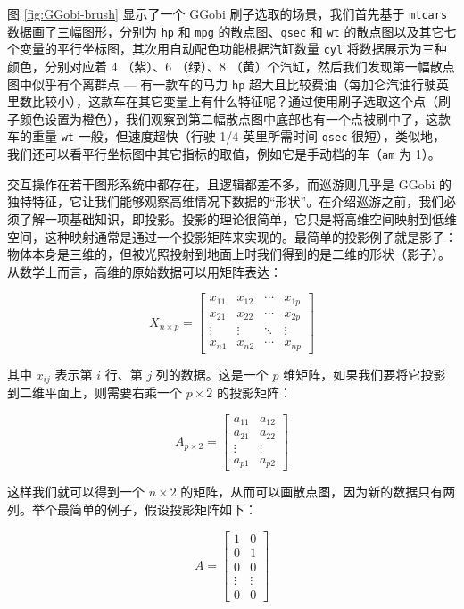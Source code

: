 \documentclass[
  b5paper,
  UTF8,twoside]{book}
\begin{document}
图 \ref{fig:GGobi-brush} 显示了一个 GGobi 刷子选取的场景，我们首先基于 \texttt{mtcars} 数据画了三幅图形，分别为 \texttt{hp} 和 \texttt{mpg} 的散点图、\texttt{qsec} 和 \texttt{wt} 的散点图以及其它七个变量的平行坐标图，其次用自动配色功能根据汽缸数量 \texttt{cyl} 将数据展示为三种颜色，分别对应着 4 （紫）、6 （绿）、8 （黄）个汽缸，然后我们发现第一幅散点图中似乎有个离群点 --- 有一款车的马力 \texttt{hp} 超大且比较费油（每加仑汽油行驶英里数比较小），这款车在其它变量上有什么特征呢？通过使用刷子选取这个点（刷子颜色设置为橙色），我们观察到第二幅散点图中底部也有一个点被刷中了，这款车的重量 \texttt{wt} 一般，但速度超快（行驶 1/4 英里所需时间 \texttt{qsec} 很短），类似地，我们还可以看平行坐标图中其它指标的取值，例如它是手动档的车（\texttt{am} 为 1）。

交互操作在若干图形系统中都存在，且逻辑都差不多，而巡游则几乎是 GGobi 的独特特征，它让我们能够观察高维情况下数据的``形状''。在介绍巡游之前，我们必须了解一项基础知识，即投影。投影的理论很简单，它只是将高维空间映射到低维空间，这种映射通常是通过一个投影矩阵来实现的。最简单的投影例子就是影子：物体本身是三维的，但被光照投射到地面上时我们得到的是二维的形状（影子）。从数学上而言，高维的原始数据可以用矩阵表达：

\[X_{n\times p} = \left[\begin{array}{cccc}
x_{11} & x_{12} & \cdots & x_{1p}\\
x_{21} & x_{22} & \cdots & x_{2p}\\
\vdots & \vdots & \ddots & \vdots\\
x_{n1} & x_{n2} & \cdots & x_{np}
\end{array}\right]\]

其中 \(x_{ij}\) 表示第 \(i\) 行、第 \(j\) 列的数据。这是一个 \(p\) 维矩阵，如果我们要将它投影到二维平面上，则需要右乘一个 \(p\times2\) 的投影矩阵：

\[A_{p\times2} = \left[\begin{array}{cc}
a_{11} & a_{12}\\
a_{21} & a_{22}\\
\vdots & \vdots\\
a_{p1} & a_{p2}
\end{array}\right]\]

这样我们就可以得到一个 \(n\times2\) 的矩阵，从而可以画散点图，因为新的数据只有两列。举个最简单的例子，假设投影矩阵如下：

\[A = \left[\begin{array}{cc}
1 & 0\\
0 & 1\\
0 & 0\\
\vdots & \vdots\\
0 & 0
\end{array}\right]\]
\end{document}
